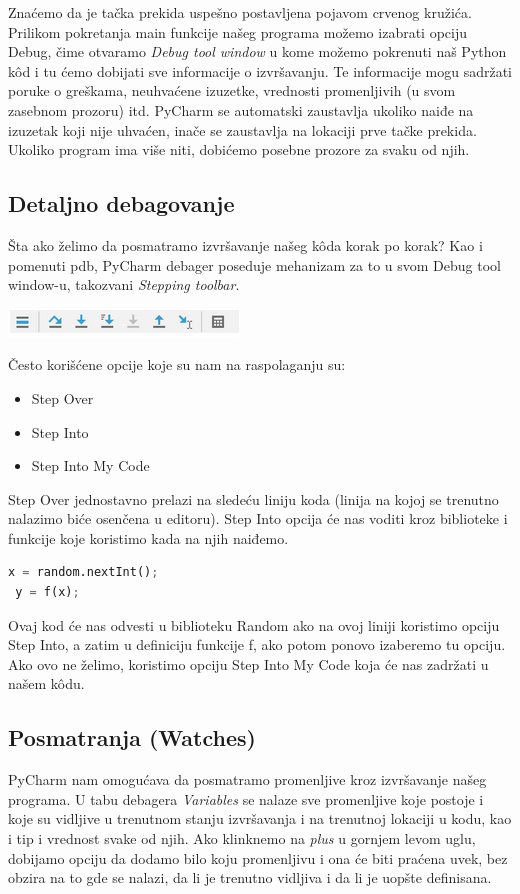 \documentclass[a4paper]{article}
\begin{document}
Znaćemo da je tačka prekida uspešno postavljena pojavom crvenog kružića\cite{pyCharm}. Prilikom pokretanja main funkcije našeg programa možemo izabrati opciju Debug, čime otvaramo \emph{Debug tool window} u kome možemo pokrenuti naš Python k\^{o}d i tu ćemo dobijati sve informacije o izvršavanju. Te informacije mogu sadržati poruke o greškama, neuhvaćene izuzetke, vrednosti promenljivih (u svom zasebnom prozoru) itd\cite{pyCharm}. PyCharm se automatski zaustavlja ukoliko naiđe na izuzetak koji nije uhvaćen, inače se zaustavlja na lokaciji prve tačke prekida\cite{pyCharm}. Ukoliko program ima više niti, dobićemo posebne prozore za svaku od njih\cite{pyCharm}.
\subsection{Detaljno debagovanje}
Šta ako želimo da posmatramo izvršavanje našeg k\^{o}da korak po korak? Kao i pomenuti pdb, PyCharm debager poseduje mehanizam za to u svom Debug tool window-u, takozvani \emph{Stepping toolbar}.

\includegraphics[scale = 0.6]{2}

Često korišćene opcije koje su nam na raspolaganju su:
\begin{itemize}
\item  Step Over
\item  Step Into
\item Step Into My Code
\end{itemize}

Step Over jednostavno prelazi na sledeću liniju koda (linija na kojoj se trenutno nalazimo biće osenčena u editoru). Step Into opcija će nas voditi kroz biblioteke i funkcije koje koristimo kada na njih naiđemo\cite{pyCharm}.
\begin{lstlisting}[language = Python, caption={Primer korišćenja bilioteke i poziva funkcije}]
 x = random.nextInt();
 y = f(x);
\end{lstlisting} 

 Ovaj kod će nas odvesti u biblioteku Random ako na ovoj liniji koristimo opciju Step Into, a zatim u definiciju funkcije f, ako potom ponovo izaberemo tu opciju. Ako ovo ne želimo, koristimo opciju Step Into My Code koja će nas zadržati u našem k\^{o}du\cite{pyCharm}. 
\subsection{Posmatranja (Watches)}
PyCharm nam omogućava da posmatramo promenljive kroz izvršavanje našeg programa. U tabu debagera \emph{Variables} se nalaze sve promenljive koje postoje i koje su vidljive u trenutnom stanju izvršavanja i na trenutnoj lokaciji u kodu, kao i tip i vrednost svake od njih\cite{pyCharm}. Ako klinknemo na \emph {plus} u gornjem levom uglu, dobijamo opciju da dodamo bilo koju promenljivu i ona će biti praćena uvek, bez obzira na to gde se nalazi, da li je trenutno vidljiva i da li je uopšte definisana\cite{pyCharm}.
\end{document}
